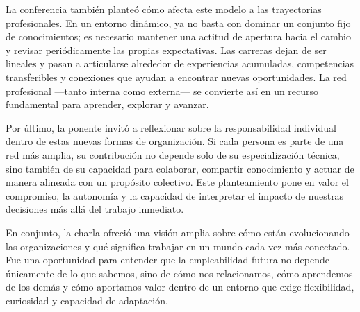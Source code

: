 La conferencia también planteó cómo afecta este modelo a las trayectorias profesionales. En un entorno dinámico, ya no basta con dominar un conjunto fijo de conocimientos; es necesario mantener una actitud de apertura hacia el cambio y revisar periódicamente las propias expectativas. Las carreras dejan de ser lineales y pasan a articularse alrededor de experiencias acumuladas, competencias transferibles y conexiones que ayudan a encontrar nuevas oportunidades. La red profesional —tanto interna como externa— se convierte así en un recurso fundamental para aprender, explorar y avanzar.

Por último, la ponente invitó a reflexionar sobre la responsabilidad individual dentro de estas nuevas formas de organización. Si cada persona es parte de una red más amplia, su contribución no depende solo de su especialización técnica, sino también de su capacidad para colaborar, compartir conocimiento y actuar de manera alineada con un propósito colectivo. Este planteamiento pone en valor el compromiso, la autonomía y la capacidad de interpretar el impacto de nuestras decisiones más allá del trabajo inmediato.

En conjunto, la charla ofreció una visión amplia sobre cómo están evolucionando las organizaciones y qué significa trabajar en un mundo cada vez más conectado. Fue una oportunidad para entender que la empleabilidad futura no depende únicamente de lo que sabemos, sino de cómo nos relacionamos, cómo aprendemos de los demás y cómo aportamos valor dentro de un entorno que exige flexibilidad, curiosidad y capacidad de adaptación.
